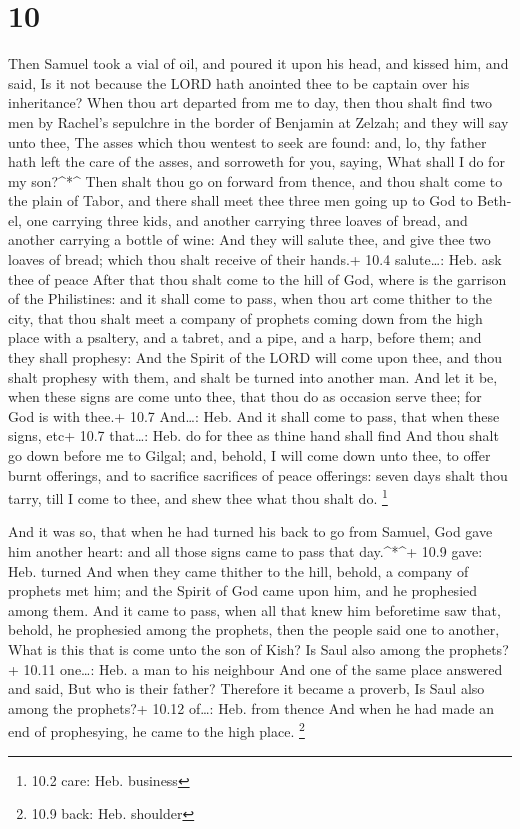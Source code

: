 \hypertarget{section-9}{%
\section{10}\label{section-9}}

 Then Samuel took a vial of oil, and poured it upon his
head, and kissed him, and said, Is it not because the LORD hath anointed
thee to be captain over his inheritance?  When thou art
departed from me to day, then thou shalt find two men by Rachel's
sepulchre in the border of Benjamin at Zelzah; and they will say unto
thee, The asses which thou wentest to seek are found: and, lo, thy
father hath left the care of the asses, and sorroweth for you, saying,
What shall I do for my son?\^{}*\^{}  Then shalt thou go on
forward from thence, and thou shalt come to the plain of Tabor, and
there shall meet thee three men going up to God to Beth-el, one carrying
three kids, and another carrying three loaves of bread, and another
carrying a bottle of wine:  And they will salute thee, and
give thee two loaves of bread; which thou shalt receive of their hands.+
10.4 salute\ldots: Heb. ask thee of peace  After that thou
shalt come to the hill of God, where is the garrison of the Philistines:
and it shall come to pass, when thou art come thither to the city, that
thou shalt meet a company of prophets coming down from the high place
with a psaltery, and a tabret, and a pipe, and a harp, before them; and
they shall prophesy:  And the Spirit of the LORD will come
upon thee, and thou shalt prophesy with them, and shalt be turned into
another man.  And let it be, when these signs are come unto
thee, that thou do as occasion serve thee; for God is with thee.+ 10.7
And\ldots: Heb. And it shall come to pass, that when these signs, etc+
10.7 that\ldots: Heb. do for thee as thine hand shall find 
And thou shalt go down before me to Gilgal; and, behold, I will come
down unto thee, to offer burnt offerings, and to sacrifice sacrifices of
peace offerings: seven days shalt thou tarry, till I come to thee, and
shew thee what thou shalt do. \footnote{10.2 care: Heb. business}

 And it was so, that when he had turned his back to go from
Samuel, God gave him another heart: and all those signs came to pass
that day.\^{}*\^{}+ 10.9 gave: Heb. turned  And when they
came thither to the hill, behold, a company of prophets met him; and the
Spirit of God came upon him, and he prophesied among them. 
And it came to pass, when all that knew him beforetime saw that, behold,
he prophesied among the prophets, then the people said one to another,
What is this that is come unto the son of Kish? Is Saul also among the
prophets?+ 10.11 one\ldots: Heb. a man to his neighbour 
And one of the same place answered and said, But who is their father?
Therefore it became a proverb, Is Saul also among the prophets?+ 10.12
of\ldots: Heb. from thence  And when he had made an end of
prophesying, he came to the high place. \footnote{10.9 back: Heb.
  shoulder}

